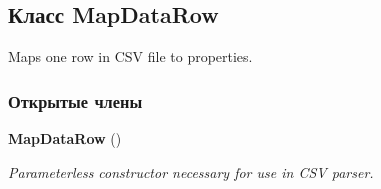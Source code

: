\subsection{Класс Map\+Data\+Row}
\label{classkdz__manager_1_1_map_data_row}


Maps one row in C\+S\+V file to properties.  


\subsubsection*{Открытые члены}
\begin{DoxyCompactItemize}
\item 
{\bf Map\+Data\+Row} ()
\begin{DoxyCompactList}\small\item\em Parameterless constructor necessary for use in C\+S\+V parser. \end{DoxyCompactList}\end{DoxyCompactItemize}
